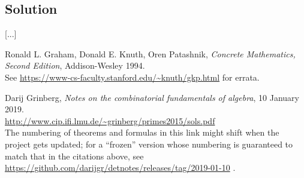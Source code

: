 \documentclass[paper=a4, fontsize=12pt]{scrartcl} %
\theoremstyle{plainsl}
\theoremstyle{definition}
\theoremstyle{remark}
\begin{document}
\subsection{Solution}

[...]

\begin{thebibliography}{99999999}                                                                                         %



Ronald L. Graham, Donald E. Knuth, Oren Patashnik,
\textit{Concrete Mathematics, Second Edition}, Addison-Wesley 1994.\\
See \url{https://www-cs-faculty.stanford.edu/~knuth/gkp.html} for errata.

Darij Grinberg,
\textit{Notes on the combinatorial fundamentals of algebra},
10 January 2019. \\
\url{http://www.cip.ifi.lmu.de/~grinberg/primes2015/sols.pdf}
\\
The numbering of theorems and formulas in this link might shift
when the project gets updated; for a ``frozen'' version whose
numbering is guaranteed to match that in the citations above, see
\url{https://github.com/darijgr/detnotes/releases/tag/2019-01-10} .

\end{thebibliography}
\end{document}
